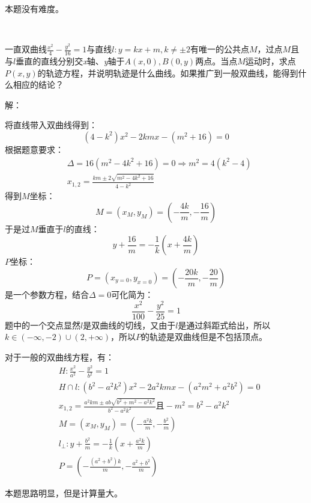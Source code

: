 \begin{tcolorbox}
本题没有难度。
\end{tcolorbox}

~

\begin{example}
一直双曲线$\frac{x^2}{4}-\frac{y^2}{16}=1$与直线$l:y=kx+m,k\ne \pm 2$有唯一的公共点$M$，过点$M$且与$l$垂直的直线分别交{\it x}轴、{\it y}轴于$A\left( x,0 \right) ,B\left( 0,y \right) $两点。当点$M$运动时，求点$P\left( x,y \right) $的轨迹方程，并说明轨迹是什么曲线。如果推广到一般双曲线，能得到什么相应的结论？
\end{example}

解：

将直线带入双曲线得到：
\[
\left( 4-k^2 \right) x^2-2kmx-\left( m^2+16 \right) =0
\]
根据题意要求：
\begin{align*}
&\varDelta =16\left( m^2-4k^2+16 \right) =0\Rightarrow m^2=4\left( k^2-4 \right) \\
&x_{1,2}=\frac{km\pm 2\sqrt{m^2-4k^2+16}}{4-k^2}
\end{align*}
得到$M$坐标：
\[
M=\left( x_M,y_M \right) =\left( -\frac{4k}{m},-\frac{16}{m} \right)
\]
于是过$M$垂直于$l$的直线：
\[
y+\frac{16}{m}=-\frac{1}{k}\left( x+\frac{4k}{m} \right)
\]
$P$坐标：
\[
P=\left( x_{y=0},y_{x=0} \right) =\left( -\frac{20k}{m},-\frac{20}{m} \right)
\]
是一个参数方程，结合$\varDelta =0$可化简为：
\[
\frac{x^2}{100}-\frac{y^2}{25}=1
\]
题中的一个交点显然$l$是双曲线的切线，又由于$l$是通过斜距式给出，所以$k\in \left( -\infty ,-2 \right) \cup \left( 2,+\infty \right) $，所以$P$的轨迹是双曲线但是不包括顶点。

对于一般的双曲线方程，有：
\begin{align*}
&H:\frac{x^2}{a^2}-\frac{y^2}{b^2}=1 \\
&H\cap l:\left( b^2-a^2k^2 \right) x^2-2a^2kmx-\left( a^2m^2+a^2b^2 \right) =0 \\
&x_{1,2}=\frac{a^2km\pm ab\sqrt{b^2+m^2-a^2k^2}}{b^2-a^2k^2}\text{且}-m^2=b^2-a^2k^2 \\
&M=\left( x_M,y_M \right) =\left( -\frac{a^2k}{m},-\frac{b^2}{m} \right) \\
&l_{\bot}:y+\frac{b^2}{m}=-\frac{1}{k}\left( x+\frac{a^2k}{m} \right) \\
&P=\left( -\frac{\left( a^2+b^2 \right) k}{m},-\frac{a^2+b^2}{m} \right)
\end{align*}

\begin{tcolorbox}
本题思路明显，但是计算量大。
\end{tcolorbox}




